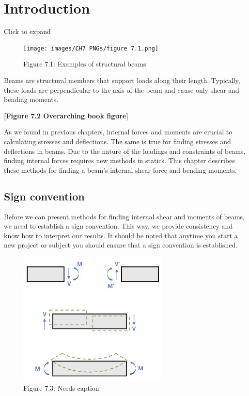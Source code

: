 \documentclass[
  letterpaper,
  DIV=11,
  numbers=noendperiod]{scrreprt}
\begin{document}
\section*{Introduction}\label{introduction-7}


Click to expand

\begin{figure}[H]

{\centering \texttt{[image: images/CH7 PNGs/figure 7.1.png]}

}

\caption{Figure 7.1: Examples of structural beams}

\end{figure}%

Beams are structural members that support loads along their length.
Typically, these loads are perpendicular to the axis of the beam and
cause only shear and bending moments.

\textbf{{[}Figure 7.2 Overarching book figure{]}}

As we found in previous chapters, internal forces and moments are
crucial to calculating stresses and deflections. The same is true for
finding stresses and deflections in beams. Due to the nature of the
loadings and constraints of beams, finding internal forces requires new
methods in statics. This chapter describes these methods for finding a
beam's internal shear force and bending moments.

\subsection*{Sign convention}\label{sign-convention}

Before we can present methods for finding internal shear and moments of
beams, we need to establish a sign convention. This way, we provide
consistency and know how to interpret our results. It should be noted
that anytime you start a new project or subject you should ensure that a
sign convention is established.

\begin{figure}[H]

{\centering \includegraphics[width=2.97917in,height=\textheight]{images/CH7 PNGs/figure 7.3.png}

}

\caption{Figure 7.3: Needs caption}

\end{figure}%
\end{document}
